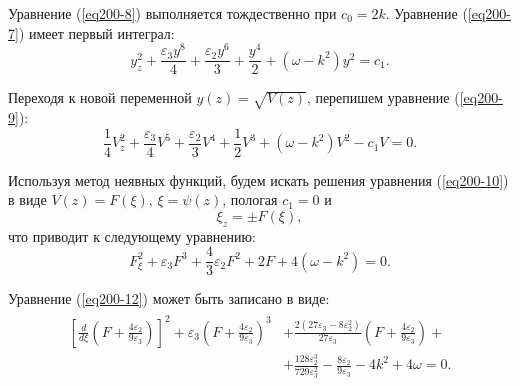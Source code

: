 \documentclass[12pt,a4paper]{article}
\begin{document}
	Уравнение (\ref{eq200-8}) выполняется тождественно при \(c_{0}=2k\). Уравнение (\ref{eq200-7}) имеет первый интеграл:
	\begin{equation} \label{eq200-9}
		y_{z}^{2}+\frac{\varepsilon_{3} y^{8} }{4}+\frac{\varepsilon_{2} y^{6} }{3}+\frac{ y^{4} }{2}+\left(\omega-k^{2}\right) y^{2} =c_{1}.
	\end{equation}

	Переходя к новой переменной \(y(z)=\sqrt{V(z)}\), перепишем уравнение (\ref{eq200-9}):
	\begin{equation} \label{eq200-10}
		\frac{ 1}{4}V_{z}^{2}+\frac{\varepsilon_{3}}{4}V^{5} +\frac{\varepsilon_{2}}{3}V^{4} +\frac{1}{2}V^{3}+\left( \omega- k^{2}\right)V^{2}-c_{1} V=0.
	\end{equation}

	Используя метод неявных функций, будем искать решения уравнения (\ref{eq200-10}) в виде \(V(z)=F(\xi),\,\xi=\psi(z)\), пологая \(c_{1}=0\) и
	\begin{equation} \label{eq200-11}
		\xi_{z}=\pm F(\xi),
	\end{equation}
	что приводит к следующему уравнению:
	\begin{equation}\label{eq200-12}
		F_{\xi}^{2}+\varepsilon_{3}F^{3}+\frac{4 }{3}\varepsilon_{2} F^{2}+2 F+4\left(\omega -k^{2}\right)=0.
	\end{equation}

	Уравнение (\ref{eq200-12}) может быть записано в виде:
	\begin{equation}\label{eq200-13}
		\begin{aligned}
			\begin{split}
			\left[\frac{d}{d\xi}\left(F+\frac{4 \varepsilon_{2}}{9 \varepsilon_{3}}\right)\right]^{2}+
			\varepsilon_{3}\left(F+\frac{4 \varepsilon_{2}}{9 \varepsilon_{3}}\right)^{3}&+
			\frac{2 (27 \varepsilon_{3} -8 \varepsilon_{2}^{2}) }{27 \varepsilon_{3}}\left(F+\frac{4 \varepsilon_{2}}{9 \varepsilon_{3}}\right)+\\
			&+\frac{128 \varepsilon_{2}^{3}}{729 \varepsilon_{3}^{2}}-\frac{8 \varepsilon_{2}}{9 \varepsilon_{3}}-4 k^{2}+4 \omega=0.
			\end{split}
		\end{aligned}
	\end{equation}
\end{document}
